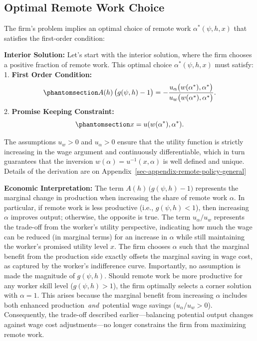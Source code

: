\documentclass[
  11pt,
  letterpaper,
  DIV=11,
  numbers=noendperiod]{scrartcl}
\theoremstyle{plain}
\theoremstyle{remark}
\begin{document}
\subsection{Optimal Remote Work
Choice}\label{optimal-remote-work-choice}

The firm's problem implies an optimal choice of remote work
\(\alpha^*(\psi, h, x)\) that satisfies the first-order condition:

\textbf{Interior Solution:} Let's start with the interior solution,
where the firm chooses a positive fraction of remote work. This optimal
choice \(\alpha^*(\psi, h, x)\) must satisfy: 1. \textbf{First Order
Condition:}
\begin{equation}\phantomsection\label{eq-interiorSolutionOptimalRemote}{A(h)\,\big(g(\psi,h)-1\big) = -\frac{u_\alpha\big(w(\alpha^*),\alpha^*\big)}{u_w\big(w(\alpha^*),\alpha^*\big)}.}\end{equation}
2. \textbf{Promise Keeping
Constraint:}\begin{equation}\phantomsection\label{eq-promiseKeepingConstraint}{
    x = u(w(\alpha^*),\alpha^*).}\end{equation}

The assumptions \(u_w > 0\) and \(u_\alpha > 0\) ensure that the utility
function is strictly increasing in the wage argument and continuously
differentiable, which in turn guarantees that the inversion
\(w(\alpha) = u^{-1}(x,\alpha)\) is well defined and unique. Details of
the derivation are on Appendix~\ref{sec-appendix-remote-policy-general}

\textbf{Economic Interpretation:} The term
\(A(h)\,\big(g(\psi,h)-1\big)\) represents the marginal change in
production when increasing the share of remote work \(\alpha\). In
particular, if remote work is less productive (i.e., \(g(\psi,h) < 1\)),
then increasing \(\alpha\) improves output; otherwise, the opposite is
true. The term \(u_\alpha/u_w\) represents the trade-off from the
worker's utility perspective, indicating how much the wage can be
reduced (in marginal terms) for an increase in \(\alpha\) while still
maintaining the worker's promised utility level \(x\). The firm chooses
\(\alpha\) such that the marginal benefit from the production side
exactly offsets the marginal saving in wage cost, as captured by the
worker's indifference curve. Importantly, no assumption is made the
magnitude of \(g(\psi, h)\). Should remote work be more productive for
any worker skill level (\(g(\psi, h) > 1\)), the firm optimally selects
a corner solution with \(\alpha=1\). This arises because the marginal
benefit from increasing \(\alpha\) includes both enhanced
production~\emph{and}~potential wage savings (\(u_\alpha/u_w > 0\)).
Consequently, the trade-off described earlier---balancing potential
output changes against wage cost adjustments---no longer constrains the
firm from maximizing remote work.
\end{document}
